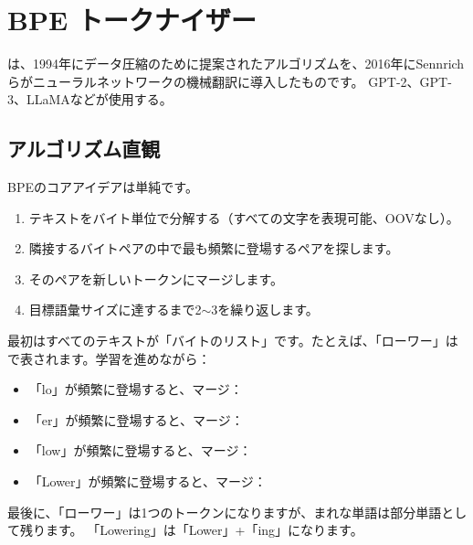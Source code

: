 \section{BPE トークナイザー}

は、1994年にデータ圧縮のために提案されたアルゴリズムを、2016年にSennrichらがニューラルネットワークの機械翻訳に導入したものです。 GPT-2、GPT-3、LLaMAなどが使用する。

\subsection{アルゴリズム直観}

BPEのコアアイデアは単純です。
\begin{enumerate}
\item テキストをバイト単位で分解する（すべての文字を表現可能、OOVなし）。
\item 隣接するバイトペアの中で最も頻繁に登場するペアを探します。
\item そのペアを新しいトークンにマージします。
\item 目標語彙サイズに達するまで2$\sim$3を繰り返します。
\end{enumerate}

最初はすべてのテキストが「バイトのリスト」です。たとえば、「ローワー」は\code{[l, o, w, e, r]}で表されます。学習を進めながら：
\begin{itemize}
\item 「lo」が頻繁に登場すると、マージ：\code{[lo, w, e, r]}
\item 「er」が頻繁に登場すると、マージ：\code{[lo, w, er]}
\item 「low」が頻繁に登場すると、マージ：\code{[low, er]}
\item 「Lower」が頻繁に登場すると、マージ：\code{[lower]}
\end{itemize}

最後に、「ローワー」は1つのトークンになりますが、まれな単語は部分単語として残ります。 「Lowering」は「Lower」+「ing」になります。

